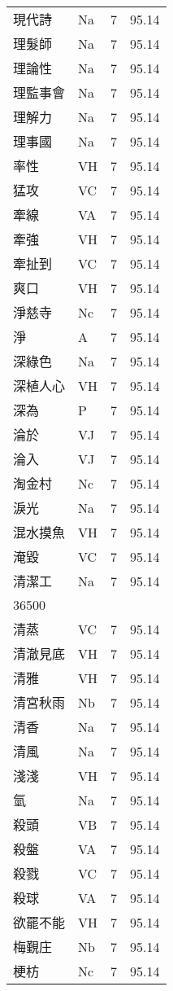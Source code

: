 \documentclass[twocolumn]{book}
\begin{document}
\begin{supertabular}{llrr}
現代詩 & Na & 7 &  95.14\\
理髮師 & Na & 7 &  95.14\\
理論性 & Na & 7 &  95.14\\
理監事會 & Na & 7 &  95.14\\
理解力 & Na & 7 &  95.14\\
理事國 & Na & 7 &  95.14\\
率性 & VH & 7 &  95.14\\
猛攻 & VC & 7 &  95.14\\
牽線 & VA & 7 &  95.14\\
牽強 & VH & 7 &  95.14\\
牽扯到 & VC & 7 &  95.14\\
爽口 & VH & 7 &  95.14\\
淨慈寺 & Nc & 7 &  95.14\\
淨 & A & 7 &  95.14\\
深綠色 & Na & 7 &  95.14\\
深植人心 & VH & 7 &  95.14\\
深為 & P & 7 &  95.14\\
淪於 & VJ & 7 &  95.14\\
淪入 & VJ & 7 &  95.14\\
淘金村 & Nc & 7 &  95.14\\
淚光 & Na & 7 &  95.14\\
混水摸魚 & VH & 7 &  95.14\\
淹毀 & VC & 7 &  95.14\\
清潔工 & Na & 7 &  95.14\\
36500\\
清蒸 & VC & 7 &  95.14\\
清澈見底 & VH & 7 &  95.14\\
清雅 & VH & 7 &  95.14\\
清宮秋雨 & Nb & 7 &  95.14\\
清香 & Na & 7 &  95.14\\
清風 & Na & 7 &  95.14\\
淺淺 & VH & 7 &  95.14\\
氫 & Na & 7 &  95.14\\
殺頭 & VB & 7 &  95.14\\
殺盤 & VA & 7 &  95.14\\
殺戮 & VC & 7 &  95.14\\
殺球 & VA & 7 &  95.14\\
欲罷不能 & VH & 7 &  95.14\\
梅覲庄 & Nb & 7 &  95.14\\
梗枋 & Nc & 7 &  95.14\\

\end{supertabular}
\end{document}
